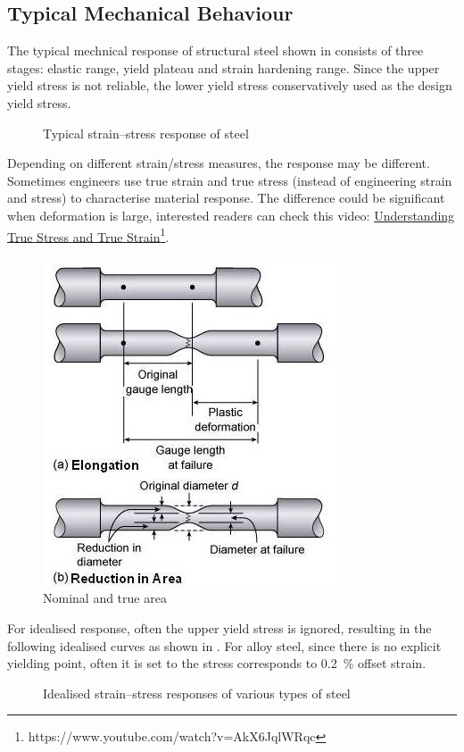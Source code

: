 \subsection{Typical Mechanical Behaviour}
The typical mechnical response of structural steel shown in  consists of three stages: elastic range, yield plateau and strain hardening range. Since the upper yield stress is not reliable, the lower yield stress conservatively used as the design yield stress.
\begin{figure}[H]
\centering

\caption{Typical strain--stress response of steel}\label{fig:steel_response}
\end{figure}
Depending on different strain/stress measures, the response may be different. Sometimes engineers use true strain and true stress (instead of engineering strain and stress) to characterise material response. The difference could be significant when deformation is large, interested readers can check this video: \href{https://www.youtube.com/watch?v=AkX6JqlWRqc}{Understanding True Stress and True Strain}\footnote{https://www.youtube.com/watch?v=AkX6JqlWRqc}.
\begin{figure}[H]
\centering
\includegraphics[scale=.8]{PIC/CH02/TA}
\caption{Nominal and true area}
\end{figure}

For idealised response, often the upper yield stress is ignored, resulting in the following idealised curves as shown in . For alloy steel, since there is no explicit yielding point, often it is set to the stress corresponds to \SI{0.2}{\percent} offset strain.
\begin{figure}[H]
\centering

\caption{Idealised strain--stress responses of various types of steel}\label{fig:steel_responses}
\end{figure}
